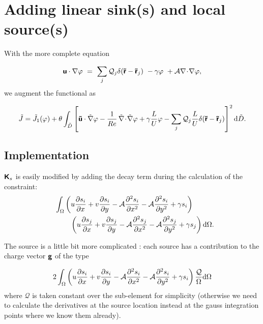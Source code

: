 \section{Adding linear sink(s) and local source(s)}

With the more complete equation

\begin{equation}
\mbox{\boldmath $ \protect\mathsf{u} $} \cdot {\nabla} \varphi
~=~ \sum_j \mathcal{Q}_j\delta( \mbox{\boldmath $ \protect\mathsf{\tilde{r}} $}-\mbox{\boldmath $ \protect\mathsf{\tilde{r}} $}_j ) ~-\gamma \varphi ~+ \mathcal{A}  {\nabla}\! \cdot\! {\nabla}\varphi ,
\end{equation}
we augment the functional as

\begin{equation}
\tilde{J}= \tilde{J}_1(\varphi) + {\theta  } \int_{\tilde{D}}\left[ 
\mbox{\boldmath $ \protect\mathsf{\tilde{u}} $} \cdot \tilde{\nabla} \varphi
- {1  \over Re} \, \tilde{\nabla}\! \cdot\! \tilde{\nabla}\varphi
 +  \gamma {L \over U}  \varphi   - \sum_j \mathcal{Q}_j {L \over U} \delta( \mbox{\boldmath $ \protect\mathsf{\tilde{r}} $}-\mbox{\boldmath $ \protect\mathsf{\tilde{r}} $}_j ) \right]^2 \mbox{d} \tilde{D}.
\end{equation}

\subsection{Implementation}


$\mbox{\boldmath $ \protect\mathsf{K} $}_s$ is easily modified by adding the decay term during the calculation of the constraint:
\begin{eqnarray}
\int_\Omega \left( u {\partial s_i \over \partial x}+v {\partial s_i \over \partial y}-\mathcal{A} {\partial^2 s_i \over \partial x^2} -\mathcal{A} {\partial^2 s_i \over \partial y^2}+ \gamma s_i \right) \quad \quad \quad \notag \\
\quad \quad \quad \left( u {\partial s_j \over \partial x}+v {\partial s_j \over \partial y}-\mathcal{A} {\partial^2 s_j \over \partial x^2} -\mathcal{A} {\partial^2 s_j \over \partial y^2}
+\gamma s_j
\right)\mbox{d} \Omega. \notag 
\end{eqnarray}

The source is a little bit more complicated :
each source has a contribution to the charge vector $\mbox{\boldmath $ \protect\mathsf{g} $}$ of the type

\begin{equation}
2 \int_\Omega \left( u {\partial s_i \over \partial x}+v {\partial s_i \over \partial y}-\mathcal{A} {\partial^2 s_i \over \partial x^2} -\mathcal{A} {\partial^2 s_i \over \partial y^2}+ \gamma s_i \right) {\mathcal{Q} \over \Omega} \mbox{d} \Omega
\end{equation}
where $\mathcal{Q}$ is taken constant over the sub-element for simplicity (otherwise we need to calculate the derivatives at the source location instead at the gauss integration points where we know them already).


